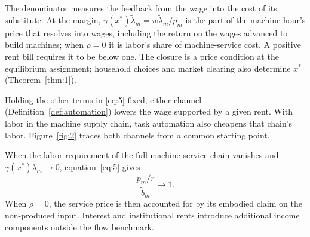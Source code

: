 \documentclass[12pt]{article}
\theoremstyle{plain}
\theoremstyle{definition}
\theoremstyle{remark}
\begin{document}
The denominator measures the feedback from the wage into the cost of its substitute. At the margin, $\gamma(x^*)\widetilde\lambda_m=w\widetilde\lambda_m/p_m$ is the part of the machine-hour's price that resolves into wages, including the return on the wages advanced to build machines; when $\rho=0$ it is labor's share of machine-service cost. A positive rent bill requires it to be below one. The closure is a price condition at the equilibrium assignment; household choices and market clearing also determine $x^*$ (Theorem~\ref{thm:1}).

Holding the other terms in \eqref{eq:5} fixed, either channel (Definition~\ref{def:automation}) lowers the wage supported by a given rent. With labor in the machine supply chain, task automation also cheapens that chain's labor. Figure~\ref{fig:2} traces both channels from a common starting point.

When the labor requirement of the full machine-service chain vanishes and $\gamma(x^*)\widetilde{\lambda}_m\to0$, equation~\eqref{eq:5} gives
\begin{equation}\label{eq:6}
\frac{p_m/r}{\widetilde{b}_m} \to 1.
\end{equation}
When $\rho=0$, the service price is then accounted for by its embodied claim on the non-produced input. Interest and institutional rents introduce additional income components outside the flow benchmark.
\end{document}
